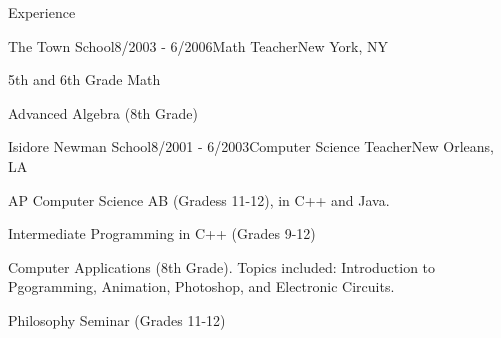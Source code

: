 \documentclass{resume} %
\begin{document}
\begin{rSection}{Experience}
\begin{rSubsection}{The Town School}{8/2003 - 6/2006}{Math Teacher}{New York, NY}
\item 5th and 6th Grade Math
\item Advanced Algebra (8th Grade)
\end{rSubsection}

\begin{rSubsection}{Isidore Newman School}{8/2001 - 6/2003}{Computer Science Teacher}{New Orleans, LA}
\item AP Computer Science AB (Gradess 11-12), in C++ and Java.
\item Intermediate Programming in C++ (Grades 9-12)
\item Computer Applications (8th Grade). Topics included: Introduction to Pgogramming, Animation, Photoshop, and Electronic Circuits.
\item Philosophy Seminar (Grades 11-12)
\end{rSubsection}

\end{rSection}






\end{document}
